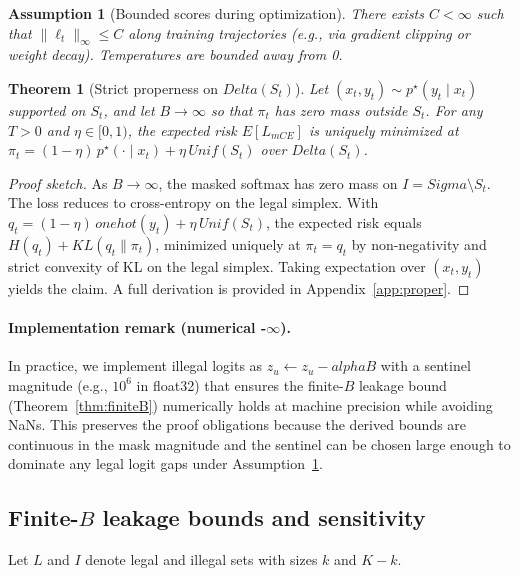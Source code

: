 \documentclass{article}
\def\alpha{alpha}%
\def\Delta{Delta}%
\def\Sigma{Sigma}%
\def\mathcal#1{#1}%
\def\mathrm#1{#1}%
\def\mathbb#1{#1}%
\newtheorem{assumption}{Assumption}
\newtheorem{theorem}{Theorem}
\begin{document}
\begin{assumption}[Bounded scores during optimization]\label{assump:bounded}
There exists $C<\infty$ such that $\|\ell_t\|_\infty\le C$ along training trajectories (e.g., via gradient clipping or weight decay). Temperatures are bounded away from 0.
\end{assumption}

\begin{theorem}[Strict properness on $\Delta(\mathcal{S}_t)$]\label{thm:proper}
Let $(x_t,y_t)\sim p^\star(y_t\mid x_t)$ supported on $\mathcal{S}_t$, and let $B\to\infty$ so that $\pi_t$ has zero mass outside $\mathcal{S}_t$. For any $T>0$ and $\eta\in[0,1)$, the expected risk $\mathbb{E}[\mathcal{L}_{\mathrm{mCE}}]$ is uniquely minimized at $\pi_t = (1-\eta)\,p^\star(\cdot\mid x_t) + \eta\,\mathrm{Unif}(\mathcal{S}_t)$ over $\Delta(\mathcal{S}_t)$.
\end{theorem}

\begin{proof}[Proof sketch]
As $B\to\infty$, the masked softmax has zero mass on $I=\Sigma\setminus\mathcal{S}_t$. The loss reduces to cross-entropy on the legal simplex. With $q_t=(1-\eta)\,\mathrm{onehot}(y_t)+\eta\,\mathrm{Unif}(\mathcal{S}_t)$, the expected risk equals $H(q_t)+\mathrm{KL}(q_t\|\pi_t)$, minimized uniquely at $\pi_t=q_t$ by non-negativity and strict convexity of KL on the legal simplex. Taking expectation over $(x_t,y_t)$ yields the claim. A full derivation is provided in Appendix~\ref{app:proper}.
\end{proof}

\paragraph{Implementation remark (numerical -$\infty$).}
In practice, we implement illegal logits as $z_u \leftarrow z_u - \alpha B$ with a sentinel magnitude (e.g., $10^6$ in float32) that ensures the finite-$B$ leakage bound (Theorem~\ref{thm:finiteB}) numerically holds at machine precision while avoiding NaNs. This preserves the proof obligations because the derived bounds are continuous in the mask magnitude and the sentinel can be chosen large enough to dominate any legal logit gaps under Assumption~\ref{assump:bounded}.

\subsection{Finite-$B$ leakage bounds and sensitivity}
Let $L$ and $I$ denote legal and illegal sets with sizes $k$ and $K-k$.
\end{document}
